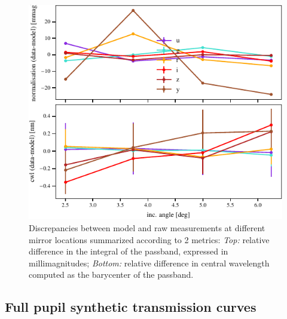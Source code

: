 \begin{figure}
  \centering
  \includegraphics[width=1\linewidth]{fig/metrics.pdf}
  \caption{Discrepancies between model and raw measurements at
    different mirror locations summarized according to 2 metrics:
    \emph{Top:} relative difference in the integral of the passband,
    expressed in millimagnitudes; \emph{Bottom:} relative difference
    in central wavelength computed as the barycenter of the passband.}
  \label{fig:metrics}
\end{figure}

\subsection{Full pupil synthetic transmission curves}

